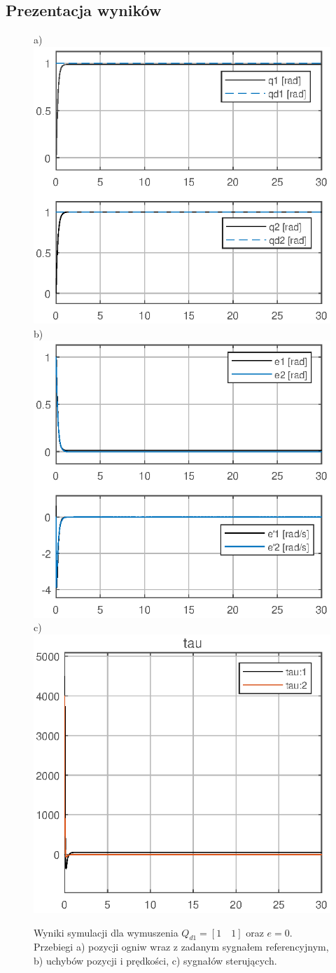 \documentclass[12pt, a4paper, polish]{article}
\begin{document}
\subsection{Prezentacja wyników}
	\begin{figure}[H]\centering
	a) \includegraphics[width=0.30\columnwidth]{SRManCw5/SRManCw5_ZADANIE2/figs/01Pozycje_e0} b)\includegraphics[width=0.30\columnwidth]{SRManCw5/SRManCw5_ZADANIE2/figs/01Uchyby_e0} c)\includegraphics[width=0.30\columnwidth]{SRManCw5/SRManCw5_ZADANIE2/figs/01Sygnal_e0}\caption{
		Wyniki symulacji dla wymuszenia $Q_{d1}=[1\quad1]$ oraz $e=0$. Przebiegi a) pozycji ogniw wraz z zadanym sygnałem referencyjnym, b) uchybów pozycji i prędkości, c)  sygnałów sterujących.}
\end{figure}
\end{document}
